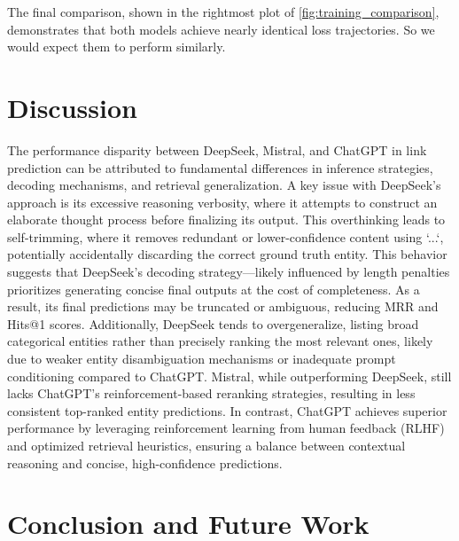 \documentclass[12pt,a4paper]{article}
\begin{document}
The final comparison, shown in the rightmost plot of \cref{fig:training_comparison}, demonstrates that both models achieve nearly identical loss trajectories.
So we would expect them to perform similarly.




%
%

\section{Discussion}\label{sec:discussion}


The performance disparity between DeepSeek, Mistral, and ChatGPT in link prediction can be attributed to fundamental differences in inference strategies, decoding mechanisms, and retrieval generalization. A key issue with DeepSeek's approach is its excessive reasoning verbosity, where it attempts to construct an elaborate thought process before finalizing its output. This overthinking leads to self-trimming, where it removes redundant or lower-confidence content using `...`, potentially accidentally discarding the correct ground truth entity. This behavior suggests that DeepSeek's decoding strategy—likely influenced by length penalties prioritizes generating concise final outputs at the cost of completeness. As a result, its final predictions may be truncated or ambiguous, reducing MRR and Hits@1 scores. Additionally, DeepSeek tends to overgeneralize, listing broad categorical entities rather than precisely ranking the most relevant ones, likely due to weaker entity disambiguation mechanisms or inadequate prompt conditioning compared to ChatGPT. Mistral, while outperforming DeepSeek, still lacks ChatGPT's reinforcement-based reranking strategies, resulting in less consistent top-ranked entity predictions. In contrast, ChatGPT achieves superior performance by leveraging reinforcement learning from human feedback (RLHF) and optimized retrieval heuristics, ensuring a balance between contextual reasoning and concise, high-confidence predictions.

%
%

\section{Conclusion and Future Work}\label{sec:conclusion-and-future-work}


\end{document}

